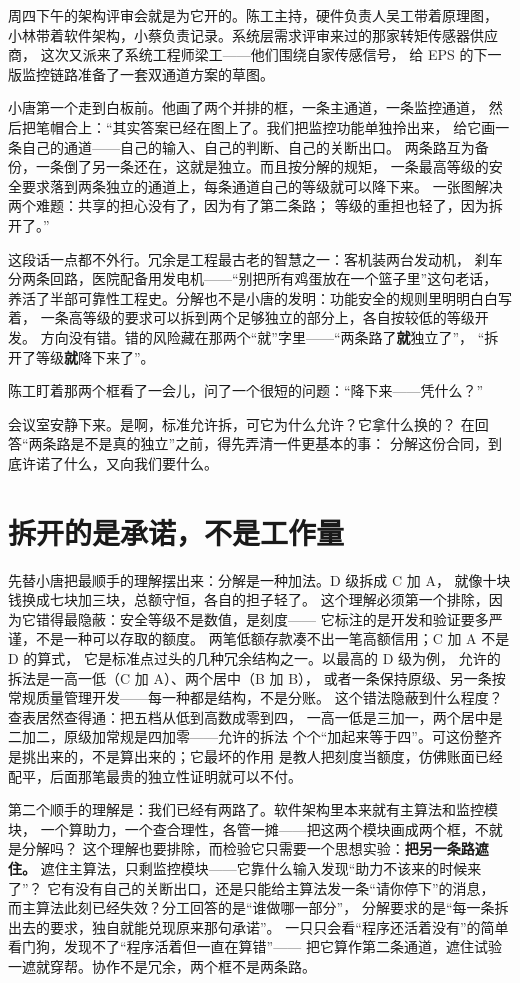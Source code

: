 周四下午的架构评审会就是为它开的。陈工主持，硬件负责人吴工带着原理图，
小林带着软件架构，小蔡负责记录。系统层需求评审来过的那家转矩传感器供应商，
这次又派来了系统工程师梁工——他们围绕自家传感信号，
给 EPS 的下一版监控链路准备了一套双通道方案的草图。

小唐第一个走到白板前。他画了两个并排的框，一条主通道，一条监控通道，
然后把笔帽合上：“其实答案已经在图上了。我们把监控功能单独拎出来，
给它画一条自己的通道——自己的输入、自己的判断、自己的关断出口。
两条路互为备份，一条倒了另一条还在，这就是独立。而且按分解的规矩，
一条最高等级的安全要求落到两条独立的通道上，每条通道自己的等级就可以降下来。
一张图解决两个难题：共享的担心没有了，因为有了第二条路；
等级的重担也轻了，因为拆开了。”

这段话一点都不外行。冗余是工程最古老的智慧之一：客机装两台发动机，
刹车分两条回路，医院配备用发电机——“别把所有鸡蛋放在一个篮子里”这句老话，
养活了半部可靠性工程史。分解也不是小唐的发明：功能安全的规则里明明白白写着，
一条高等级的要求可以拆到两个足够独立的部分上，各自按较低的等级开发。
方向没有错。错的风险藏在那两个“就”字里——“两条路了\textbf{就}独立了”，
“拆开了等级\textbf{就}降下来了”。

陈工盯着那两个框看了一会儿，问了一个很短的问题：“降下来——凭什么？”

会议室安静下来。是啊，标准允许拆，可它为什么允许？它拿什么换的？
在回答“两条路是不是真的独立”之前，得先弄清一件更基本的事：
分解这份合同，到底许诺了什么，又向我们要什么。

\section{拆开的是承诺，不是工作量}

先替小唐把最顺手的理解摆出来：分解是一种加法。D 级拆成 C 加 A，
就像十块钱换成七块加三块，总额守恒，各自的担子轻了。
这个理解必须第一个排除，因为它错得最隐蔽：安全等级不是数值，是刻度——
它标注的是开发和验证要多严谨，不是一种可以存取的额度。
两笔低额存款凑不出一笔高额信用；C 加 A 不是 D 的算式，
它是标准点过头的几种冗余结构之一。以最高的 D 级为例，
允许的拆法是一高一低（C 加 A）、两个居中（B 加 B），
或者一条保持原级、另一条按常规质量管理开发——每一种都是结构，不是分账。
这个错法隐蔽到什么程度？查表居然查得通：把五档从低到高数成零到四，
一高一低是三加一，两个居中是二加二，原级加常规是四加零——允许的拆法
个个“加起来等于四”。可这份整齐是挑出来的，不是算出来的；它最坏的作用
是教人把刻度当额度，仿佛账面已经配平，后面那笔最贵的独立性证明就可以不付。

第二个顺手的理解是：我们已经有两路了。软件架构里本来就有主算法和监控模块，
一个算助力，一个查合理性，各管一摊——把这两个模块画成两个框，不就是分解吗？
这个理解也要排除，而检验它只需要一个思想实验：\textbf{把另一条路遮住。}
遮住主算法，只剩监控模块——它靠什么输入发现“助力不该来的时候来了”？
它有没有自己的关断出口，还是只能给主算法发一条“请你停下”的消息，
而主算法此刻已经失效？分工回答的是“谁做哪一部分”，
分解要求的是“每一条拆出去的要求，独自就能兑现原来那句承诺”。
一只只会看“程序还活着没有”的简单看门狗，发现不了“程序活着但一直在算错”——
把它算作第二条通道，遮住试验一遮就穿帮。协作不是冗余，两个框不是两条路。

